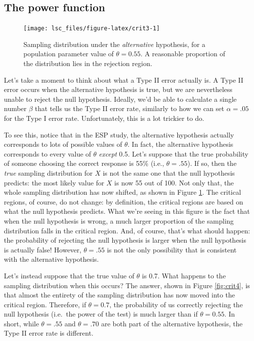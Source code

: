 \documentclass[
  11pt,
  a4paper,
  twoside,symmetric,openright]{book}
\theoremstyle{break}
\theoremstyle{break}
\begin{document}
\subsection{The power function}\label{the-power-function}



\begin{figure}

{\centering \texttt{[image: lsc\_files/figure-latex/crit3-1]} 

}

\caption{Sampling distribution under the \emph{alternative} hypothesis, for a population parameter value of \(θ = 0.55\). A reasonable proportion of the distribution lies in the rejection region.}\label{fig:crit3}
\end{figure}

Let's take a moment to think about what a Type II error actually is. A Type II error occurs when the alternative hypothesis is true, but we are nevertheless unable to reject the null hypothesis. Ideally, we'd be able to calculate a single number \(\beta\) that tells us the Type II error rate, similarly to how we can set \(\alpha = .05\) for the Type I error rate. Unfortunately, this is a lot trickier to do.

To see this, notice that in the ESP study, the alternative hypothesis actually corresponds to lots of possible values of \(\theta\). In fact, the alternative hypothesis corresponds to every value of \(\theta\) \emph{except} 0.5. Let's suppose that the true probability of someone choosing the correct response is 55\% (i.e., \(\theta = .55\)). If so, then the \emph{true} sampling distribution for \(X\) is not the same one that the null hypothesis predicts: the most likely value for \(X\) is now 55 out of 100. Not only that, the whole sampling distribution has now shifted, as shown in Figure \ref{fig:crit3}. The critical regions, of course, do not change: by definition, the critical regions are based on what the null hypothesis predicts. What we're seeing in this figure is the fact that when the null hypothesis is wrong, a much larger proportion of the sampling distribution falls in the critical region. And, of course, that's what should happen: the probability of rejecting the null hypothesis is larger when the null hypothesis is actually false! However, \(\theta = .55\) is not the only possibility that is consistent with the alternative hypothesis.

Let's instead suppose that the true value of \(\theta\) is 0.7. What happens to the sampling distribution when this occurs? The answer, shown in Figure \ref{fig:crit4}, is that almost the entirety of the sampling distribution has now moved into the critical region. Therefore, if \(\theta = 0.7\), the probability of us correctly rejecting the null hypothesis (i.e.~the power of the test) is much larger than if \(\theta = 0.55\). In short, while \(\theta = .55\) and \(\theta = .70\) are both part of the alternative hypothesis, the Type II error rate is different.
\end{document}
